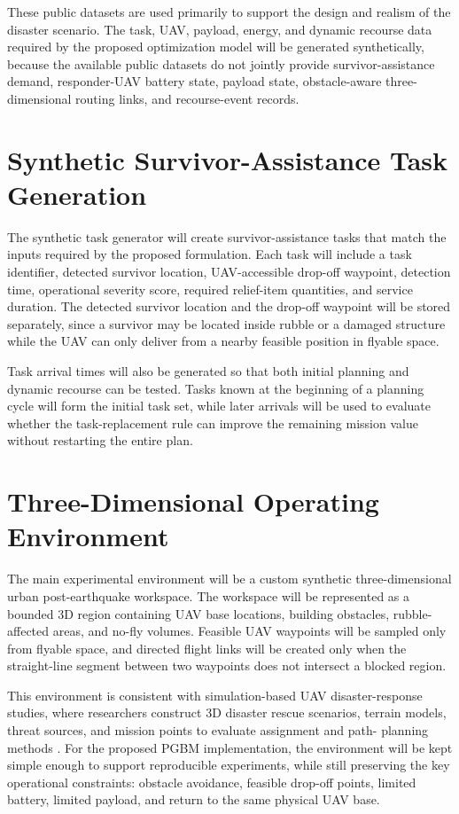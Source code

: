 These public datasets are used primarily to support the design and realism of
the disaster scenario. The task, UAV, payload, energy, and dynamic recourse
data required by the proposed optimization model will be generated
synthetically, because the available public datasets do not jointly provide
survivor-assistance demand, responder-UAV battery state, payload state,
obstacle-aware three-dimensional routing links, and recourse-event records.

\section{Synthetic Survivor-Assistance Task Generation}

The synthetic task generator will create survivor-assistance tasks that match
the inputs required by the proposed formulation. Each task will include a task
identifier, detected survivor location, UAV-accessible drop-off waypoint,
detection time, operational severity score, required relief-item quantities,
and service duration. The detected survivor location and the drop-off waypoint
will be stored separately, since a survivor may be located inside rubble or a
damaged structure while the UAV can only deliver from a nearby feasible
position in flyable space.

Task arrival times will also be generated so that both initial planning and
dynamic recourse can be tested. Tasks known at the beginning of a planning
cycle will form the initial task set, while later arrivals will be used to
evaluate whether the task-replacement rule can improve the remaining mission
value without restarting the entire plan.

\section{Three-Dimensional Operating Environment}

The main experimental environment will be a custom synthetic three-dimensional
urban post-earthquake workspace. The workspace will be represented as a bounded
3D region containing UAV base locations, building obstacles, rubble-affected
areas, and no-fly volumes. Feasible UAV waypoints will be sampled only from
flyable space, and directed flight links will be created only when the
straight-line segment between two waypoints does not intersect a blocked
region.

This environment is consistent with simulation-based UAV disaster-response
studies, where researchers construct 3D disaster rescue scenarios, terrain
models, threat sources, and mission points to evaluate assignment and path-
planning methods \cite{xiong2023multidrone,liu2021multiuv}. For the proposed
PGBM implementation, the environment will be kept simple enough to support
reproducible experiments, while still preserving the key operational
constraints: obstacle avoidance, feasible drop-off points, limited battery,
limited payload, and return to the same physical UAV base.

